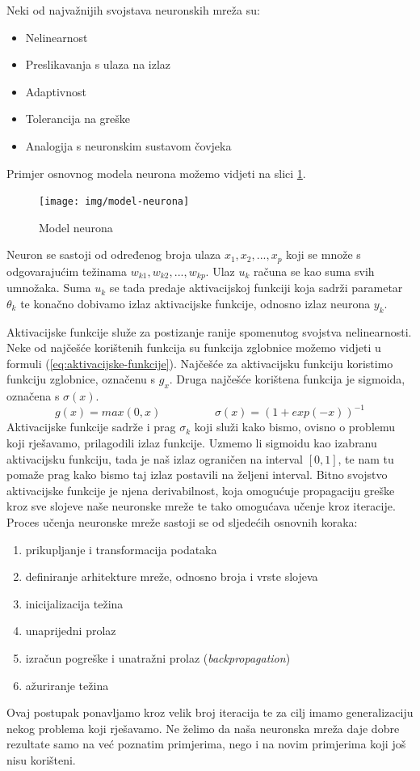 \documentclass[times, utf8, diplomskirad]{fer}
\begin{document}
Neki od najvažnijih svojstava neuronskih mreža su:
\begin{itemize}
    \item Nelinearnost
    \item Preslikavanja s ulaza na izlaz
    \item Adaptivnost
    \item Tolerancija na greške
    \item Analogija s neuronskim sustavom čovjeka
\end{itemize}
Primjer osnovnog modela neurona možemo vidjeti na slici \ref{fig:model-neurona}.
\begin{figure}[H]
    \centering
    \texttt{[image: img/model-neurona]}
    \caption{Model neurona}
    \label{fig:model-neurona}
\end{figure}
Neuron se sastoji od određenog broja ulaza $x_1, x_2, ..., x_p$ koji se množe s odgovarajućim težinama $w_{k1}, w_{k2}, ..., w_{kp}$.
Ulaz $u_k$ računa se kao suma svih umnožaka.
Suma $u_k$ se tada predaje aktivacijskoj funkciji koja sadrži parametar $\theta_k$ te konačno dobivamo izlaz aktivacijske funkcije, odnosno izlaz neurona $y_k$.

Aktivacijske funkcije služe za postizanje ranije spomenutog svojstva nelinearnosti.
Neke od najčešće korištenih funkcija su funkcija zglobnice možemo vidjeti u formuli (\ref{eq:aktivacijske-funkcije}).
Najčešće za aktivacijsku funkciju koristimo funkciju zglobnice, označenu s $g_x$.
Druga najčešće korištena funkcija je sigmoida, označena s $\sigma(x)$.
\begin{equation}
    g(x) = max(0,x) \hspace{2cm} \sigma(x) = (1 + exp(-x))^{-1}
    \label{eq:aktivacijske-funkcije}
\end{equation}
Aktivacijske funkcije sadrže i prag $\sigma_k$ koji služi kako bismo, ovisno o problemu koji rješavamo, prilagodili izlaz funkcije.
Uzmemo li sigmoidu kao izabranu aktivacijsku funkciju, tada je naš izlaz ograničen na interval $[0,1]$, te nam tu pomaže prag kako bismo taj izlaz postavili na željeni interval.
Bitno svojstvo aktivacijske funkcije je njena derivabilnost, koja omogućuje propagaciju greške kroz sve slojeve naše neuronske mreže te tako omogućava učenje kroz iteracije.
\newpage
\noindent Proces učenja neuronske mreže sastoji se od sljedećih osnovnih koraka:
\begin{enumerate}
    \item prikupljanje i transformacija podataka
    \item definiranje arhitekture mreže, odnosno broja i vrste slojeva
    \item inicijalizacija težina
    \item unaprijedni prolaz
    \item izračun pogreške i unatražni prolaz (\textit{backpropagation})
    \item ažuriranje težina
\end{enumerate}
Ovaj postupak ponavljamo kroz velik broj iteracija te za cilj imamo generalizaciju nekog problema koji rješavamo.
Ne želimo da naša neuronska mreža daje dobre rezultate samo na već poznatim primjerima, nego i na novim primjerima koji još nisu korišteni.
\end{document}
